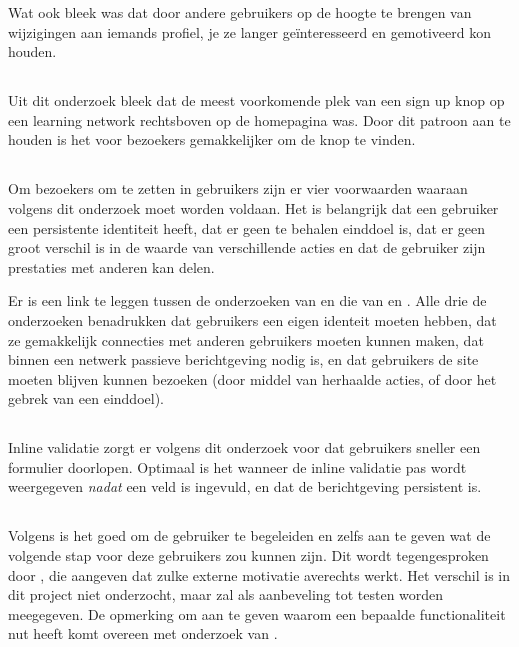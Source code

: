 \documentclass[a4paper, 10pt, pdftex]{report}
\begin{document}
        Wat ook bleek was dat door andere gebruikers op de hoogte te brengen van wijzigingen aan iemands profiel, je ze langer ge\"interesseerd en gemotiveerd kon houden.

      \subsection{\cite{Editorial2008}}
      Uit dit onderzoek bleek dat de meest voorkomende plek van een sign up knop op een learning network rechtsboven op de homepagina was. Door dit patroon aan te houden is het voor bezoekers gemakkelijker om de knop te vinden.

      \subsection{\cite{Sloep2009}}
      Om bezoekers om te zetten in gebruikers zijn er vier voorwaarden waaraan volgens dit onderzoek moet worden voldaan. Het is belangrijk dat een gebruiker een persistente identiteit heeft, dat er geen te behalen einddoel is, dat er geen groot verschil is in de waarde van verschillende acties en dat de gebruiker zijn prestaties met anderen kan delen.

      Er is een link te leggen tussen de onderzoeken van \citeauthor{Sloep2009} en die van \citeauthor{Brouns2008} en \citeauthor{Sohn2005}. Alle drie de onderzoeken benadrukken dat gebruikers een eigen identeit moeten hebben, dat ze gemakkelijk connecties met anderen gebruikers moeten kunnen maken, dat binnen een netwerk passieve berichtgeving nodig is, en dat gebruikers de site moeten blijven kunnen bezoeken (door middel van herhaalde acties, of door het gebrek van een einddoel). 

      \subsection{\cite{Wroblewski2009}}
        Inline validatie zorgt er volgens dit onderzoek voor dat gebruikers sneller een formulier doorlopen. Optimaal is het wanneer de inline validatie pas wordt weergegeven \emph{nadat} een veld is ingevuld, en dat de berichtgeving persistent is.

      \subsection{\cite{Alfrink2008}}
        Volgens \citeauthor{Alfrink2008} is het goed om de gebruiker te begeleiden en zelfs aan te geven wat de volgende stap voor deze gebruikers zou kunnen zijn. Dit wordt tegengesproken door \cite{Beenen2004}, die aangeven dat zulke externe motivatie averechts werkt. Het verschil is in dit project niet onderzocht, maar zal als aanbeveling tot testen worden meegegeven. De opmerking om aan te geven waarom een bepaalde functionaliteit nut heeft komt overeen met onderzoek van \cite{Brouns2008}.
\end{document}
